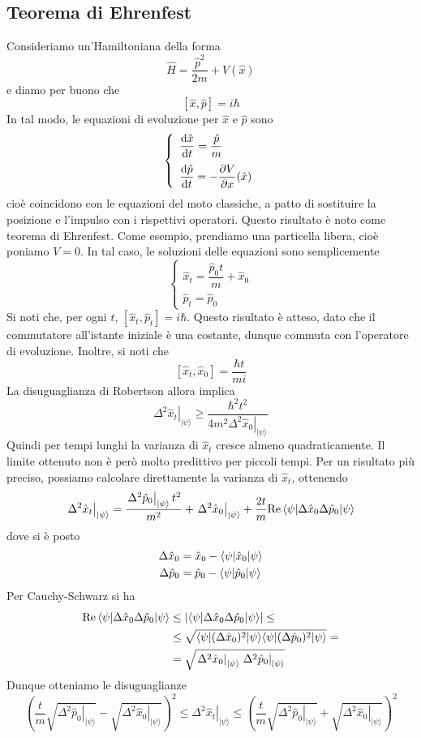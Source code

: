 \documentclass[a4paper, 11pt]{article}
\newcommand{\imp}{\hat{p}}
\newcommand{\ham}{\hat{H}}
\renewcommand{\ket}[1]{| #1\rangle}
\begin{document}
\subsection{Teorema di Ehrenfest}
Consideriamo un'Hamiltoniana della forma
\[\ham=\frac{\imp^2}{2m}+V(\hat{x})\]
e diamo per buono che
\[[\hat{x},\hat{p}]=i\hbar\]
In tal modo, le equazioni di evoluzione per $\hat{x}$ e $\imp$ sono
\[\left\{\begin{array}{l}
	\dfrac{\mathrm{d} \hat{x}}{\mathrm{d} t}=\dfrac{\hat{p}}{m}\\[10pt]\dfrac{\mathrm{d} \hat{p}}{\mathrm{d} t}=-\dfrac{\partial V}{\partial x}(\hat{x})
\end{array}\right.
\]
cioè coincidono con le equazioni del moto classiche, a patto di sostituire la posizione e l'impulso con i rispettivi operatori. Questo risultato è noto come teorema di Ehrenfest. Come esempio, prendiamo una particella libera, cioè poniamo $V=0$. In tal caso, le soluzioni delle equazioni sono semplicemente
\[\left\{\begin{array}{l}\hat{x}_t=\dfrac{\hat{p}_0t}{m}+\hat{x}_0\\[10 pt]\hat{p}_t=\imp_0
\end{array}\right.
\]
Si noti che, per ogni $t$, $[\hat{x}_t,\imp_t]=i\hbar$. Questo risultato è atteso, dato che il commutatore all'istante iniziale è una costante, dunque commuta con l'operatore di evoluzione. Inoltre, si noti che
\[[\hat{x}_t,\hat{x}_0]=\frac{\hbar t}{mi}\]
La disuguaglianza di Robertson allora implica
\[\left.\Delta^2\hat{x}_t\right|_{\ket{\psi}}\geq\frac{\hbar^2t^2}{4m^2\left.\Delta^2\hat{x}_0\right|_{\ket{\psi}}}\]
Quindi per tempi lunghi la varianza di $\hat{x}_t$ cresce almeno quadraticamente. Il limite ottenuto non è però molto predittivo per piccoli tempi. Per un risultato più preciso, possiamo calcolare direttamente la varianza di $\hat{x}_t$, ottenendo
\[\left.\Delta^2\hat{x}_t\right|_{\ket{\psi}}=\frac{\left.\Delta^2\hat{p}_0\right|_{\ket{\psi}}t^2}{m^2}+\left.\Delta^2\hat{x}_0\right|_{\ket{\psi}}+\frac{2t}{m}\Re\braketop{\psi}{\Delta\hat{x}_0\Delta\hat{p}_0}{\psi}\]
dove si è posto
\begin{align*}
	\Delta\hat{x}_0&=\hat{x}_0-\langle\psi|\hat{x}_0|\psi\rangle\\
	\Delta\hat{p}_0&=\hat{p}_0-\langle\psi|\hat{p}_0|\psi\rangle
\end{align*}
Per Cauchy-Schwarz si ha
\begin{align*}\Re\braketop{\psi}{\Delta\hat{x}_0\Delta\hat{p}_0}{\psi}&\leq\left|\braketop{\psi}{\Delta\hat{x}_0\Delta\hat{p}_0}{\psi}\right|\leq\\&\leq\sqrt{\braketop{\psi}{(\Delta\hat{x}_0)^2}{\psi}\braketop{\psi}{(\Delta\hat{p}_0)^2}{\psi}}=\\&=\sqrt{\left.\Delta^2\hat{x}_0\right|_{\ket{\psi}}\left.\Delta^2\hat{p}_0\right|_{\ket{\psi}}}\end{align*}
Dunque otteniamo le disuguaglianze
\[\left(\frac{t}{m}\sqrt{\left.\Delta^2\hat{p}_0\right|_{\ket{\psi}}}-\sqrt{\left.\Delta^2\hat{x}_0\right|_{\ket{\psi}}}\right)^2\leq\left.\Delta^2\hat{x}_t\right|_{\ket{\psi}}\leq\left(\frac{t}{m}\sqrt{\left.\Delta^2\hat{p}_0\right|_{\ket{\psi}}}+\sqrt{\left.\Delta^2\hat{x}_0\right|_{\ket{\psi}}}\right)^2\]
\end{document}
